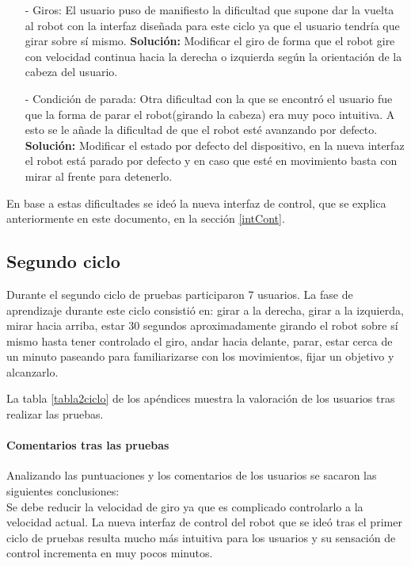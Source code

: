 \documentclass[twoside, 11pt]{epstfg}
\begin{document}
\begin{itemize}
	\item [ - ] Giros: El usuario puso de manifiesto la dificultad que supone dar la vuelta al robot con la interfaz diseñada para este ciclo ya que el usuario tendría que girar sobre sí mismo.
	\subitem \textbf{Solución:} Modificar el giro de forma que el robot gire con velocidad continua hacia la derecha o izquierda según la orientación de la cabeza del usuario. 
	\item [ - ] Condición de parada: Otra dificultad con la que se encontró el usuario fue que la forma de parar el robot(girando la cabeza) era muy poco intuitiva.  A esto se le añade la dificultad de que el robot esté avanzando por defecto.
	\subitem \textbf{Solución:} Modificar el estado por defecto del dispositivo, en la nueva interfaz el robot está parado por defecto y en caso que esté en movimiento basta con mirar al frente para detenerlo.
\end{itemize}

En base a estas dificultades se ideó la nueva interfaz de control, que se explica anteriormente en este documento, en la sección  \ref{intCont}.

\subsection{Segundo ciclo}

Durante el segundo ciclo de pruebas participaron 7 usuarios.
La fase de aprendizaje durante este ciclo consistió en: girar a la derecha, girar a la izquierda, mirar hacia arriba, estar 30 segundos aproximadamente girando el robot sobre sí mismo hasta tener controlado el giro, andar hacia delante, parar, estar cerca de un minuto paseando para familiarizarse con los movimientos, fijar un objetivo y alcanzarlo.


La tabla \ref{tabla2ciclo} de los apéndices muestra la valoración de los usuarios tras realizar las pruebas.


\paragraph{Comentarios tras las pruebas}

Analizando las puntuaciones y los comentarios de los usuarios se sacaron las siguientes conclusiones:\\
Se debe reducir la velocidad de giro ya que es complicado controlarlo a la velocidad actual.
La nueva interfaz de control del robot que se ideó tras el primer ciclo de pruebas resulta mucho más intuitiva para los usuarios y su sensación de control incrementa en muy pocos minutos.
\end{document}
